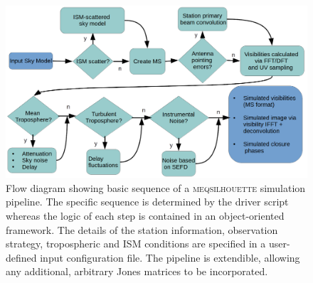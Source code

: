 \begin{figure}[h!]
\includegraphics[width=\columnwidth]{Images/flow_full2}
\caption[Flow diagram showing basic sequence of a \textsc{meqsilhouette} simulation pipeline.]{Flow diagram showing basic sequence of a \textsc{meqsilhouette} simulation pipeline. The specific sequence is determined by the driver script whereas the logic of each step is contained in an object-oriented framework. The details of the station information, observation strategy, tropospheric and ISM conditions are specified in a user-defined input configuration file. The pipeline is extendible, allowing any additional, arbitrary Jones matrices to be incorporated. \label{flow}%
}
\end{figure}

